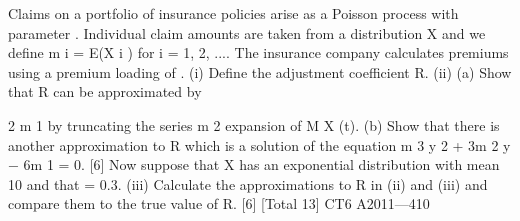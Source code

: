 \documentclass[a4paper,12pt]{article}
\begin{document}
Claims on a portfolio of insurance policies arise as a Poisson process with parameter
\lambda . Individual claim amounts are taken from a distribution X and we define m i = E(X i )
for i = 1, 2, .... The insurance company calculates premiums using a premium
loading of \theta .
(i) Define the adjustment coefficient R.
(ii) (a)
Show that R can be approximated by

2 \theta  m 1
by truncating the series
m 2
expansion of M X (t).
(b)
Show that there is another approximation to R which is a solution of
the equation m 3 y 2 + 3m 2 y − 6\theta m 1 = 0.
[6]
Now suppose that X has an exponential distribution with mean 10 and that \theta  = 0.3.
(iii)
Calculate the approximations to R in (ii) and (iii) and compare them to the true
value of R.
[6]
[Total 13]
CT6 A2011—410


\end{document}

